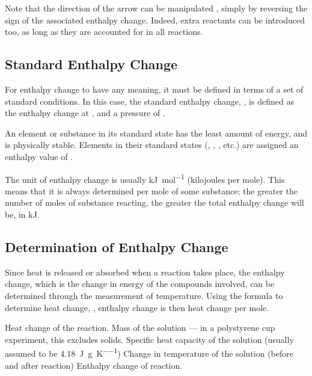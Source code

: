 			Note that the direction of the arrow can be manipulated , simply by reversing the sign of the associated enthalpy
			change. Indeed, extra reactants can be introduced too, as long as they are accounted for in all reactions.


		\subsection{Standard Enthalpy Change}

			For enthalpy change to have any meaning, it must be defined in terms of a set of standard conditions. In this case, the standard
			enthalpy change, \enthStd{}, is defined as the enthalpy change at , and a pressure of .

			An element or substance in its standard state has the least amount of energy, and is physically stable. Elements in their standard
			states (, , , etc.) are assigned an enthalpy value of .

			The unit of enthalpy change is usually \si{\kilo\joule\per\mole} (kilojoules per mole). This means that it is always determined
			per mole of some substance; the greater the number of moles of substance reacting, the greater the total enthalpy change will be,
			in \si{\kilo\joule}.


		\pagebreak
		\subsection{Determination of Enthalpy Change}

			Since heat is released or absorbed when a reaction takes place, the enthalpy change, which is the change in energy of the compounds
			involved, can be determined through the measurement of temperature. Using the formula to determine heat change, , enthalpy change
			is then heat change per mole.


			\vbox{
				\tabto{0mm}\tabto{15mm}	Heat change of the reaction.
				\tabto{0mm}\tabto{15mm}	Mass of the solution — in a polystyrene cup experiment, this excludes solids.
				\tabto{0mm}\tabto{15mm}	Specific heat capacity of the solution (usually assumed to be \SI{4.18}{\joule\per\gram\per\kelvin})
				\tabto{0mm}\tabto{15mm}Change in temperature of the solution (before and after reaction)
				\tabto{0mm}\tabto{15mm}Enthalpy change of reaction.
			}

